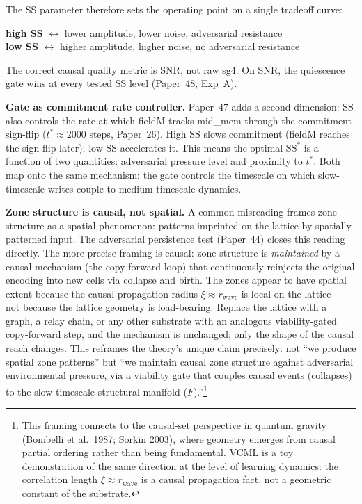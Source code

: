 \documentclass[11pt]{article}
\begin{document}
The SS parameter therefore sets the operating point on a single tradeoff curve:
\begin{center}
  \textbf{high SS} $\leftrightarrow$ lower amplitude, lower noise, adversarial resistance\\
  \textbf{low SS} $\leftrightarrow$ higher amplitude, higher noise, no adversarial resistance
\end{center}
The correct causal quality metric is SNR, not raw sg4.
On SNR, the quiescence gate wins at every tested SS level (Paper~48, Exp~A).

\textbf{Gate as commitment rate controller.}
Paper~47 adds a second dimension: SS also controls the rate at which fieldM tracks
mid\_mem through the commitment sign-flip ($t^* \approx 2000$ steps, Paper~26).
High SS slows commitment (fieldM reaches the sign-flip later); low SS accelerates it.
This means the optimal $\mathrm{SS}^*$ is a function of two quantities:
adversarial pressure level and proximity to $t^*$.
Both map onto the same mechanism: the gate controls the timescale on which slow-timescale
writes couple to medium-timescale dynamics.

\textbf{Zone structure is causal, not spatial.}
A common misreading frames zone structure as a spatial phenomenon: patterns imprinted
on the lattice by spatially patterned input.
The adversarial persistence test (Paper~44) closes this reading directly.
The more precise framing is causal:
zone structure is \emph{maintained} by a causal mechanism (the copy-forward loop)
that continuously reinjects the original encoding into new cells via collapse and birth.
The zones appear to have spatial extent because the causal propagation radius
$\xi \approx r_\mathrm{wave}$ is local on the lattice --- not because the lattice
geometry is load-bearing.
Replace the lattice with a graph, a relay chain, or any other substrate with an
analogous viability-gated copy-forward step, and the mechanism is unchanged;
only the shape of the causal reach changes.
This reframes the theory's unique claim precisely:
not ``we produce spatial zone patterns'' but
``we maintain causal zone structure against adversarial environmental pressure,
via a viability gate that couples causal events (collapses) to the slow-timescale
structural manifold ($F$).''\footnote{This framing connects to the causal-set perspective
in quantum gravity (Bombelli et al.\ 1987; Sorkin 2003), where geometry emerges from
causal partial ordering rather than being fundamental.
VCML is a toy demonstration of the same direction at the level of learning dynamics:
the correlation length $\xi \approx r_\mathrm{wave}$ is a causal propagation fact,
not a geometric constant of the substrate.}
\end{document}
